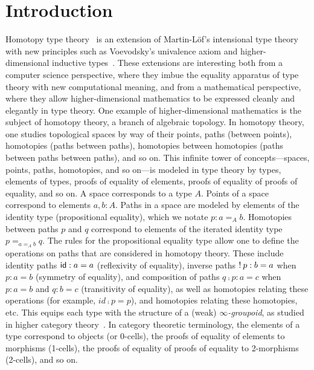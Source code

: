 \newcommand\Z{\ensuremath{\mathbb{Z}}}

\section{Introduction}

Homotopy type theory~\citep{awodeywarren09identity,voevodsky11wollic} is an extension of Martin-L\"of's
intensional type
theory~\citep{nps90mltt,martinlof71itt}
 with new principles such as Voevodsky's
univalence axiom
and higher-dimensional inductive
types~\citep{lumsdaine+13hits}.  These extensions are interesting both from a
computer science perspective, where they imbue the equality apparatus of
type theory with new computational meaning, and from a mathematical
perspective, where they allow higher-dimensional mathematics to be
expressed cleanly and elegantly in type theory.  One example of
higher-dimensional mathematics is the subject of homotopy theory, a
branch of algebraic topology.  In homotopy theory, one studies
topological spaces by way of their points, paths (between points),
homotopies
(paths between paths), homotopies between
homotopies (paths between paths between paths), and so on.  This infinite tower of concepts---spaces,
points, paths, homotopies, and so on---is modeled in type theory by
types, elements of types, proofs of equality of elements, proofs of
equality of proofs of equality, and so on.  A space corresponds to a
type $A$. Points of a space correspond to elements $a,b : A$. Paths in a
space are modeled by elements of the identity type (propositional equality), which we
notate $p : a =_A b$.  Homotopies between paths $p$ and $q$ correspond
to elements of the iterated identity type $p =_{a =_A b} q$.  The
rules for the propositional equality type allow one to define the
operations on paths that are considered in homotopy theory.  These include identity paths
$\mathsf{id} : a = a$ (reflexivity of equality), inverse paths $! \: p : b
= a$ when $p : a = b$ (symmetry of equality), and composition of paths
$q \comp p : a = c$ when $p : a = b$ and $q : b = c$ (transitivity of
equality), as well as homotopies relating these operations (for example,
$id \comp p = p$), and homotopies relating these homotopies, etc.  This
equips each type with the structure of a (weak)
\emph{$\infty$-groupoid}, as studied in higher category
theory~\citep{lumsdaine09omega,vandenberggarner10groupoids}.  In category theoretic terminology, the elements of
a type correspond to objects (or 0-cells), the proofs of equality of
elements to morphisms (1-cells), the proofs of equality of proofs of
equality to 2-morphisms (2-cells), and so on.

